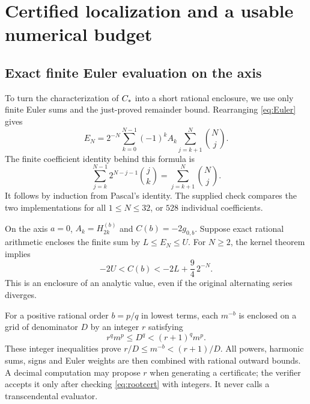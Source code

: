 \section{Certified localization and a usable numerical budget}
\label{sec:cert}
\subsection{Exact finite Euler evaluation on the axis}
To turn the characterization of $C_*$ into a short rational enclosure, we use only finite Euler sums and the just-proved remainder bound. Rearranging \eqref{eq:Euler} gives
\begin{equation}\label{eq:finiteweights}
 E_N=2^{-N}\sum_{k=0}^{N-1}(-1)^k A_k
                  \sum_{j=k+1}^{N}\binom Nj.
\end{equation}
The finite coefficient identity behind this formula is
\[
 \sum_{j=k}^{N-1}2^{N-j-1}\binom jk
 =\sum_{j=k+1}^{N}\binom Nj.
\]
It follows by induction from Pascal's identity. The supplied check compares the two implementations for all $1\le N\le32$, or $528$ individual coefficients.

On the axis $a=0$, $A_k=H_{2k}^{(b)}$ and $C(b)=-2g_{0,b}$. Suppose exact rational arithmetic encloses the finite sum by $L\le E_N\le U$. For $N\ge2$, the kernel theorem implies
\begin{equation}\label{eq:axisinterval}
 -2U<C(b)<-2L+\frac{9}{4}\,2^{-N}.
\end{equation}
This is an enclosure of an analytic value, even if the original alternating series diverges.

For a positive rational order $b=p/q$ in lowest terms, each $m^{-b}$ is enclosed on a grid of denominator $D$ by an integer $r$ satisfying
\begin{equation}\label{eq:rootcert}
 r^q m^p\le D^q<(r+1)^q m^p.
\end{equation}
These integer inequalities prove $r/D\le m^{-b}<(r+1)/D$. All powers, harmonic sums, signs and Euler weights are then combined with rational outward bounds. A decimal computation may propose $r$ when generating a certificate; the verifier accepts it only after checking \eqref{eq:rootcert} with integers. It never calls a transcendental evaluator.


